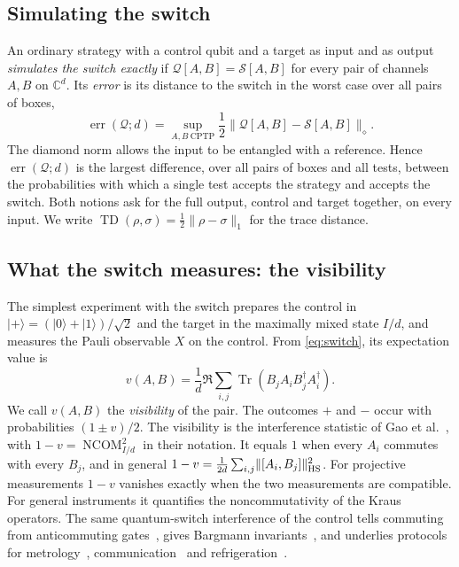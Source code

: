 \documentclass[11pt,letterpaper]{article}
\theoremstyle{definition}\newtheorem{definition}[theorem]{Definition}
\newcommand{\C}{\mathbb C}
\newcommand{\Tr}{\operatorname{Tr}}
\newcommand{\TD}{\operatorname{TD}}
\newcommand{\ket}[1]{\lvert#1\rangle}
\newcommand{\norm}[1]{\lVert#1\rVert}
\newcommand{\SW}{\mathcal S}
\newcommand{\QC}{\mathcal Q}
\begin{document}
\subsection{Simulating the switch}

An ordinary strategy with a control qubit and a target as input and as
output \emph{simulates the switch exactly} if $\QC[A,B]=\SW[A,B]$ for
every pair of channels $A,B$ on $\C^d$. Its \emph{error} is its distance to the
switch in the worst case over all pairs of boxes,
\begin{equation}\label{eq:simulation-error}
 \operatorname{err}(\QC;d)=
 \sup_{A,B\ \mathrm{CPTP}}\frac12\norm{\QC[A,B]-\SW[A,B]}_\diamond .
\end{equation}
The diamond norm allows the input to be entangled with a reference.
Hence $\operatorname{err}(\QC;d)$ is the largest difference, over all
pairs of boxes and all tests, between the probabilities with which a
single test accepts the strategy and accepts the switch.
Both notions ask for the full output, control and target together, on
every input. We write $\TD(\rho,\sigma)=\frac12\norm{\rho-\sigma}_1$ for
the trace distance.

\subsection{What the switch measures: the visibility}\label{sec:visibility}

The simplest experiment with the switch prepares the control in
$\ket+=(\ket0+\ket1)/\sqrt2$ and the target in the maximally mixed
state $I/d$, and measures the Pauli observable $X$ on the control. From
\eqref{eq:switch}, its expectation value is
\begin{equation}\label{eq:visibility}
 v(A,B)=\frac1d\Re\sum_{i,j}\Tr(B_jA_iB_j^\dagger A_i^\dagger).
\end{equation}
We call $v(A,B)$ the \emph{visibility} of the pair. The outcomes $+$ and
$-$ occur with probabilities $(1\pm v)/2$. The visibility is the
interference statistic of Gao et al.~\cite{gao2023}, with
$1-v=\operatorname{NCOM}_{I/d}^2$ in their notation. It equals $1$ when
every $A_i$ commutes with every $B_j$, and in general
$1-v=\frac1{2d}\sum_{i,j}\norm{[A_i,B_j]}_{\rm HS}^2$. For projective
measurements $1-v$ vanishes exactly when the two measurements are
compatible. For general instruments it quantifies the noncommutativity
of the Kraus operators. The same quantum-switch interference of the control tells
commuting from anticommuting
gates~\cite{procopio2015,chiribella2012}, gives Bargmann
invariants~\cite{azado2025}, and underlies protocols for
metrology~\cite{zhao2020}, communication~\cite{ebler2018} and
refrigeration~\cite{felce2020}.
\end{document}
